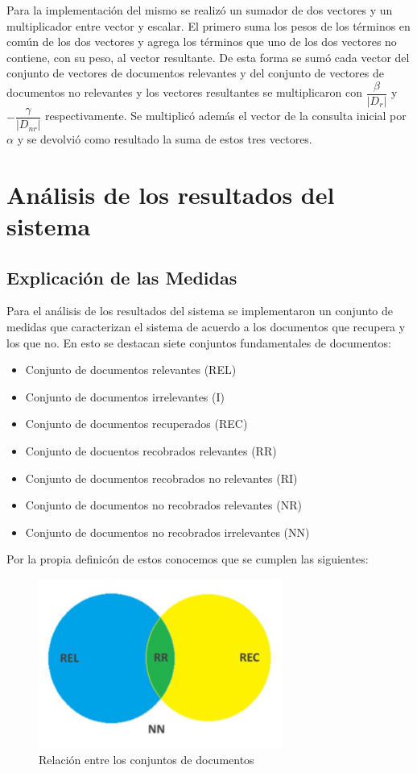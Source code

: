 \documentclass[runningheads]{llncs}
\begin{document}
Para la implementación del mismo se realizó un sumador de dos vectores y un multiplicador entre vector y escalar. El primero suma los pesos de los términos en común de los dos vectores y agrega los términos que uno de los dos vectores no contiene, con su peso, al vector resultante. De esta forma se sumó cada vector del conjunto de vectores de documentos relevantes y del conjunto de vectores de documentos no relevantes y los vectores resultantes se multiplicaron con $ \dfrac{\beta}{|D_{r}|} $ y $-\dfrac{\gamma}{|D_{nr}|} $ respectivamente. Se multiplicó además el vector de la consulta inicial por $ \alpha $ y se devolvió como resultado la suma de estos tres vectores.

	\section{An\'alisis de los resultados del sistema}
	
	\subsection{Explicaci\'on de las Medidas}
	Para el an\'alisis de los resultados del sistema se implementaron un conjunto de medidas que caracterizan el sistema de acuerdo a los documentos que recupera y los que no. En esto se destacan siete conjuntos fundamentales de documentos:
	\begin{itemize}
	\item Conjunto de documentos relevantes (REL)
	\item Conjunto de documentos irrelevantes (I)
	\item Conjunto de documentos recuperados (REC)
	\item Conjunto de docuentos recobrados relevantes (RR)
	\item Conjunto de documentos recobrados no relevantes (RI)
	\item Conjunto de documentos no recobrados relevantes (NR)
	\item Conjunto de documentos no recobrados irrelevantes (NN)
	\end{itemize}
	
	Por la propia definic\'on de estos conocemos que se cumplen las siguientes:
	\begin{figure}[h]
		\begin{center}
			\includegraphics[width =8.0cm]{Diagrama.png}
			\caption[Fig 3]{Relación entre los conjuntos de documentos}		
		\end{center}
	\end{figure}
	
\end{document}
